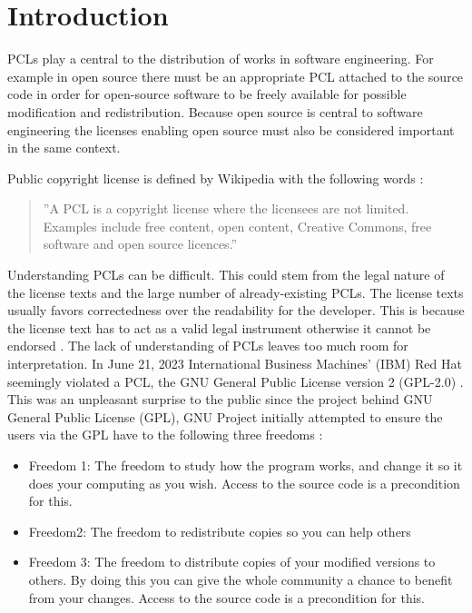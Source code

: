 \chapter{Introduction\label{intro}}

PCLs play a central to the distribution of works in software engineering. For example in open source there must be an appropriate PCL attached to the source code in order for open-source software to be freely available for possible modification and redistribution. Because open source is central to software engineering the licenses enabling open source must also be considered important in the same context.

Public copyright license is defined by Wikipedia with the following words \citep{wikipedia:publiclicenses}:
\begin{quote}
	''A PCL is a copyright license where the licensees are not limited. Examples include free content, open content, Creative Commons, free software and open source licences.''
\end{quote}

Understanding PCLs can be difficult. This could stem from the legal nature of the license texts and the large number of already-existing PCLs. The license texts usually favors correctedness over the readability for the developer. This is because the license text has to act as a valid legal instrument otherwise it cannot be endorsed \citep{ferguson2006gpl}. The lack of understanding of PCLs leaves too much room for interpretation. In June 21, 2023 International Business Machines' (IBM) Red Hat seemingly violated a PCL, the GNU General Public License version 2 (GPL-2.0) \citep{sfc:rhel} \citep{ibm:rhel}. This was an unpleasant surprise to the public since the project behind GNU General Public License (GPL), GNU Project initially attempted to ensure the users via the GPL have to the following three freedoms \citep{gnu:free}:
\begin{itemize}
	\item Freedom 1:	The freedom to study how the program works, and change it so it does your computing as you wish. Access to the source code is a precondition for this.
	\item Freedom2: The freedom to redistribute copies so you can help others
	\item Freedom 3:	The freedom to distribute copies of your modified versions to others. By doing this you can give the whole community a chance to benefit from your changes. Access to the source code is a precondition for this.
\end{itemize}

